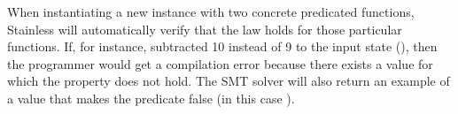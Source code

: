 When instantiating a new  instance with two concrete predicated functions, Stainless 
will automatically verify that the  law holds for those particular functions. If, for 
instance,  subtracted 10 instead of 9 to the input state (), 
then the programmer would get a compilation error because there exists a  value for which 
the  property does not hold. The SMT solver will also return an example of a value 
that makes the predicate false (in this case ).


\endinput
